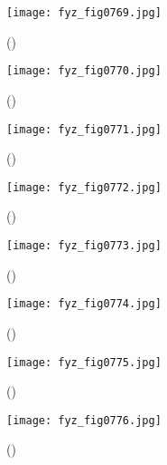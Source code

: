     \begin{figure}[ht!] %
      \centering
      \texttt{[image: fyz\_fig0769.jpg]}
      \caption{
               (\cite[s.~707]{Feynman02})}
      \label{fyz:fig0769}
    \end{figure}

    \begin{figure}[ht!] %
      \centering
      \texttt{[image: fyz\_fig0770.jpg]}
      \caption{
               (\cite[s.~707]{Feynman02})}
      \label{fyz:fig0770}
    \end{figure}

    \begin{figure}[ht!] %
      \centering
      \texttt{[image: fyz\_fig0771.jpg]}
      \caption{
               (\cite[s.~707]{Feynman02})}
      \label{fyz:fig0771}
    \end{figure}

    \begin{figure}[ht!] %
      \centering
      \texttt{[image: fyz\_fig0772.jpg]}
      \caption{
               (\cite[s.~707]{Feynman02})}
      \label{fyz:fig0772}
    \end{figure}

    \begin{figure}[ht!] %
      \centering
      \texttt{[image: fyz\_fig0773.jpg]}
      \caption{
               (\cite[s.~707]{Feynman02})}
      \label{fyz:fig0773}
    \end{figure}

    \begin{figure}[ht!] %
      \centering
      \texttt{[image: fyz\_fig0774.jpg]}
      \caption{
               (\cite[s.~707]{Feynman02})}
      \label{fyz:fig0774}
    \end{figure}

    \begin{figure}[ht!] %
      \centering
      \texttt{[image: fyz\_fig0775.jpg]}
      \caption{
               (\cite[s.~707]{Feynman02})}
      \label{fyz:fig0775}
    \end{figure}

    \begin{figure}[ht!] %
      \centering
      \texttt{[image: fyz\_fig0776.jpg]}
      \caption{
               (\cite[s.~707]{Feynman02})}
      \label{fyz:fig0776}
    \end{figure}

